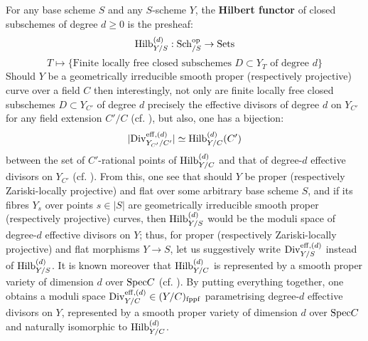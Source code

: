             \begin{remark} \label{remark: moduli_space_of_effective_divisors}
                For any base scheme $S$ and any $S$-scheme $Y$, the \textbf{Hilbert functor} of closed subschemes of degree $d \geq 0$ is the presheaf:
                    $$\mathrm{Hilb}_{Y/S}^{(d)}: \mathrm{Sch}_{/S}^{\mathrm{op}} \to \mathrm{Sets}$$
                    $$T \mapsto \{\text{Finite locally free closed subschemes $D \subset Y_T$ of degree $d$}\}$$
                Should $Y$ be a geometrically irreducible smooth proper (respectively projective) curve over a field $C$ then interestingly, not only are finite locally free closed subschemes $D \subset Y_{C'}$ of degree $d$ precisely the effective divisors of degree $d$ on $Y_{C'}$ for any field extension $C'/C$ (cf. \cite[\href{https://stacks.math.columbia.edu/tag/0B9D}{Tag 0B9D}]{stacks}), but also, one has a bijection:
                    $$|\mathrm{Div}_{Y_{C'}/C'}^{\mathrm{eff}, (d)}| \simeq \mathrm{Hilb}_{Y/C}^{(d)}(C')$$
                between the set of $C'$-rational points of $\mathrm{Hilb}_{Y/C}^{(d)}$ and that of degree-$d$ effective divisors on $Y_{C'}$ (cf. \cite[\href{https://stacks.math.columbia.edu/tag/0B9I}{Tag 0B9I}]{stacks}). From this, one see that should $Y$ be proper (respectively Zariski-locally projective) and flat over some arbitrary base scheme $S$, and if its fibres $Y_s$ over points $s \in |S|$ are geometrically irreducible smooth proper (respectively projective) curves, then $\mathrm{Hilb}_{Y/S}^{(d)}$ would be the moduli space of degree-$d$ effective divisors on $Y$; thus, for proper (respectively Zariski-locally projective) and flat morphisms $Y \to S$, let us suggestively write $\mathrm{Div}_{Y/S}^{\mathrm{eff}, (d)}$ instead of $\mathrm{Hilb}_{Y/S}^{(d)}$. It is known moreover that $\mathrm{Hilb}_{Y/C}^{(d)}$ is represented by a smooth proper variety of dimension $d$ over $\mathrm{Spec} C$ (cf. \cite[\href{https://stacks.math.columbia.edu/tag/0B9I}{Tag 0B9I}]{stacks}). By putting everything together, one obtains a moduli space $\mathrm{Div}_{Y/C}^{\mathrm{eff}, (d)} \in (Y/C)_{\mathrm{fppf}}$ parametrising degree-$d$ effective divisors on $Y$, represented by a smooth proper variety of dimension $d$ over $\mathrm{Spec} C$ and naturally isomorphic to $\mathrm{Hilb}_{Y/C}^{(d)}$.
            \end{remark}
            
